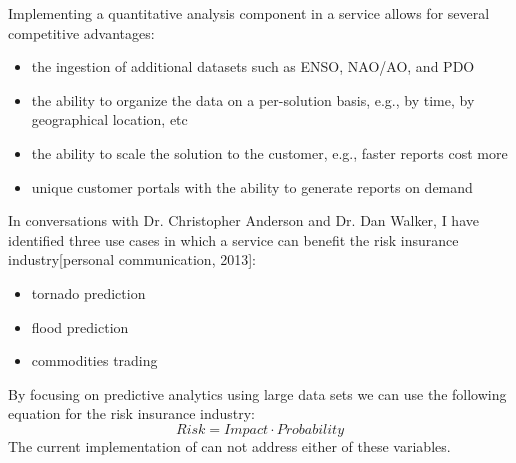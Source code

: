 Implementing a quantitative analysis component in a \ce service allows for several competitive advantages:
\begin{itemize}
    \item{the ingestion of additional datasets such as \textsc{ENSO}, \textsc{NAO/AO}, and \textsc{PDO}\cite[p. 1]{methods}}
    \item{the ability to organize the data on a per-solution basis, e.g., by time, by geographical location, etc}
    \item{the ability to scale the solution to the customer, e.g., faster reports cost more}
    \item{unique customer portals with the ability to generate reports on demand}
\end{itemize}
In conversations with Dr. Christopher Anderson and Dr. Dan Walker, I have identified three use cases in which a \ce service can benefit the risk insurance industry[personal communication, 2013]:
\begin{itemize}
    \item tornado prediction
    \item flood prediction
    \item commodities trading
\end{itemize}
By focusing on predictive analytics using large data sets we can use the following equation for the risk insurance industry:
\begin{equation*}
    Risk = Impact \cdot Probability
\end{equation*}
The current implementation of \climatedge can not address either of these variables.

\renewcommand\bibname{{References}}



